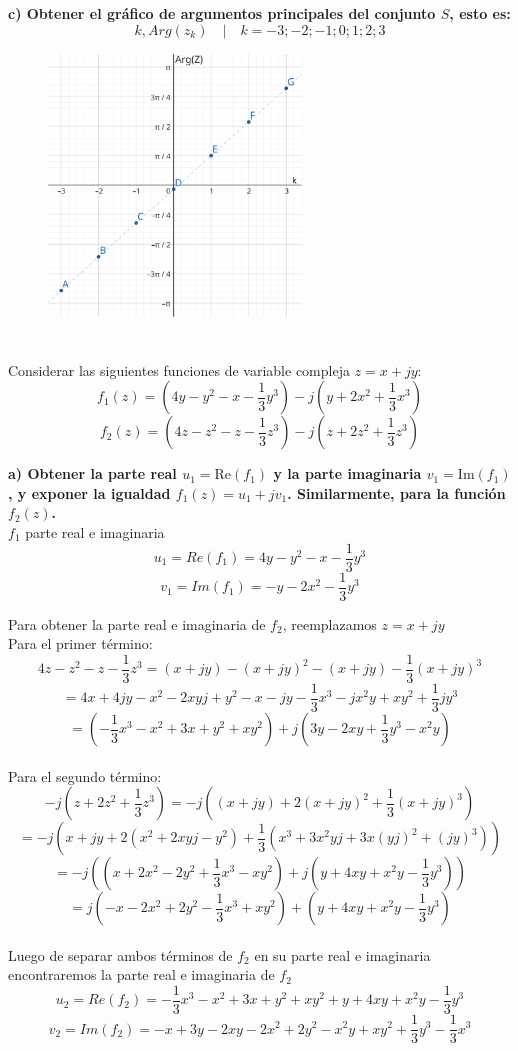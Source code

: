 \documentclass[12pt,a4paper]{report}
\begin{document}
\vspace{3cm}
\textbf{c) Obtener el gráfico de argumentos principales del conjunto $S$, esto es:}\\
    $$k, Arg(z_k) \quad | \quad k = -3;-2;-1;0;1;2;3 $$
\begin{figure}[h] %
    \centering %
    \includegraphics[width=0.6\textwidth]{./Imagenes/foto2Ej1.png} %
\end{figure}
\chapter{}%
Considerar las siguientes funciones de variable compleja $z = x + jy$:
$$f_1(z) = (4y - y^2 - x - \frac{1}{3}y^3) - j(y + 2x^2 + \frac{1}{3}x^3)$$
$$f_2(z) = (4z - z^2 - z - \frac{1}{3}z^3) - j(z + 2z^2 + \frac{1}{3}z^3)$$

\textbf{a) Obtener la parte real $u_1 = \text{Re}(f_1)$ y la parte imaginaria $v_1 = \text{Im}(f_1)$
, y exponer la igualdad $f_1(z) = u_1 + jv_1$. Similarmente, para la función $f_2(z)$.}\\

$f_1$ parte real e imaginaria
$$u_1=Re(f_1)=4y-y^2-x-\frac{1}{3}y^3$$
$$v_1=Im(f_1)=-y-2x^2-\frac{1}{3}y^3$$

Para obtener la parte real e imaginaria de $f_2$, reemplazamos $z=x+jy$\\
Para el primer término:
$$4z - z^2 - z - \frac{1}{3}z^3=(x+jy) - (x+jy)^2 - (x+jy) - \frac{1}{3}(x+jy)^3$$
$$=4x + 4jy -x^2 -2xyj + y^2 -x -jy - \frac{1}{3}x^3 - jx^2y + xy^2 + \frac{1}{3}jy^3$$
$$=(- \frac{1}{3}x^3 -x^2 + 3x + y^2 + xy^2) +j(3y -2xy + \frac{1}{3}y^3 - x^2y )$$ \\
Para el segundo término:
$$-j (z + 2z^2 + \frac{1}{3}z^3) = -j ((x+jy) + 2(x+jy)^2 + \frac{1}{3}(x+jy)^3)$$
$$=-j (x+jy + 2(x^2+2xyj-y^2) + \frac{1}{3}(x^3 + 3x^2yj + 3x(yj)^2 + (jy)^3))$$
$$=-j ((x + 2x^2 - 2y^2 + \frac{1}{3} x^3 - xy^2) + j( y +4xy + x^2y - \frac{1}{3}y^3))$$
$$=j(-x - 2x^2 + 2y^2 - \frac{1}{3} x^3 + xy^2) + ( y +4xy + x^2y - \frac{1}{3}y^3)$$\\
Luego de separar ambos términos de $f_2$ en su parte real e imaginaria encontraremos la parte real
e imaginaria de $f_2$
$$u_2=Re(f_2)=- \frac{1}{3}x^3 - x^2 + 3x + y^2 + xy^2 + y +4xy + x^2y - \frac{1}{3}y^3$$
$$v_2=Im(f_2)=-x + 3y -2xy - 2x^2 + 2y^2 - x^2y + xy^2 + \frac{1}{3}y^3 - \frac{1}{3} x^3$$
\end{document}

